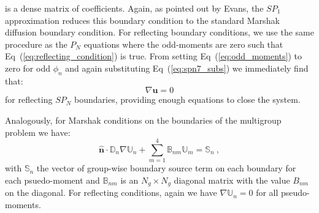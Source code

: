 is a dense matrix of coefficients. Again, as pointed out by Evans, the
$SP_1$ approximation reduces this boundary condition to the standard
Marshak diffusion boundary condition. For reflecting boundary
conditions, we use the same procedure as the $P_N$ equations where the
odd-moments are zero such that Eq~(\ref{eq:reflecting_condition}) is
true. From setting Eq~(\ref{eq:odd_moments}) to zero for odd $\phi_n$
and again substituting Eq~(\ref{eq:spn7_subs}) we immediately find
that:
\begin{equation}
  \nabla \mathbf{u} = 0
  \label{eq:spn_reflecting}
\end{equation}
for reflecting $SP_N$ boundaries, providing enough equations to close
the system.

Analogously, for Marshak conditions on the boundaries of the
multigroup problem we have:
\begin{equation}
  \hat{\mathbf{n}} \cdot \mathbb{D}_n \nabla \mathbb{U}_n +
  \sum_{m=1}^4 \mathbb{B}_{nm} \mathbb{U}_m = \mathbb{S}_n\:,
  \label{eq:spn_multigroup_bnd}
\end{equation}
with $\mathbb{S}_n$ the vector of group-wise boundary source term on
each boundary for each psuedo-moment and $\mathbb{B}_{nm}$ is an $N_g
\times N_g$ diagonal matrix with the value $B_{nm}$ on the
diagonal. For reflecting conditions, again we have $\nabla
\mathbb{U}_n = 0$ for all pseudo-moments.
